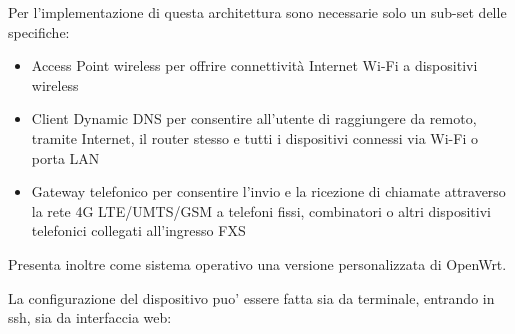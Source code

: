 Per l'implementazione di questa architettura sono necessarie solo un sub-set delle specifiche:

\begin{itemize} %
	\item Access Point wireless per offrire connettività Internet Wi-Fi a dispositivi wireless
	\item Client Dynamic DNS per consentire all’utente di raggiungere da remoto, tramite Internet, il router stesso e tutti i dispositivi connessi via Wi-Fi o porta LAN
	\item Gateway telefonico per consentire l’invio e la ricezione di chiamate attraverso la rete 4G LTE/UMTS/GSM a telefoni fissi, combinatori o altri dispositivi telefonici collegati all’ingresso FXS
\end{itemize}

Presenta inoltre come sistema operativo una versione personalizzata di OpenWrt.

La configurazione del dispositivo puo' essere fatta sia da terminale, entrando in ssh, sia da interfaccia web:

